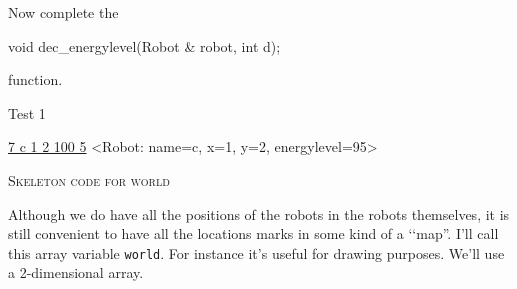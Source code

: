 Now complete the
\begin{console}[commandchars=\\\{\}]
void dec_energylevel(Robot & robot, int d);
\end{console}
function.

Test 1
\begin{console}[commandchars=\\\{\}]
\underline{7 c 1 2 100 5}
<Robot: name=c, x=1, y=2, energylevel=95>
\end{console}

\newpage
\textsc{Skeleton code for world}

Although we do have all the positions of the robots in the robots themselves,
it is still convenient to have all the locations marks in some kind of a 
\lq\lq map''.
I'll call this array variable \verb!world!.
For instance it's useful for drawing purposes.
We'll use a 2-dimensional array.
